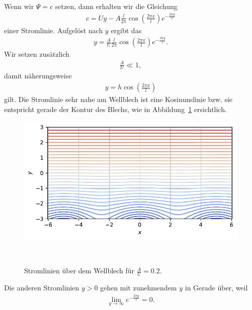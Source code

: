 Wenn wir $\Psi = c$ setzen, dann erhalten wir die Gleichung
\begin{align}
    c = U y - A \frac{l}{2 \pi} 
    \cos\left(\frac{2 \pi x}{l}\right) 
    e^{-\frac{2 \pi y}{l}}\label{eq:stromlinie}
\end{align}
einer Stromlinie.
Aufgelöst nach $y$ ergibt das
\begin{align*}
    y
    =
    \frac{A}{U} \frac{l}{2 \pi} 
    \cos\left(\frac{2 \pi x}{l}\right) 
    e^{-\frac{2 \pi y}{l}}.
\end{align*}
Wir setzen zusätzlich 
\begin{align*}
    \frac{A}{U} \ll 1,
\end{align*}
damit näherungsweise
\begin{align*}
    y
    =
    h \cos\left(\frac{2 \pi x}{l}\right)
\end{align*}
gilt.
Die Stromlinie sehr nahe am Wellblech ist eine
Kosinunslinie bzw. sie entspricht gerade der Kontur
des Blechs, wie in Abbildung~\ref{fig:stromlinien} ersichtlich.
\begin{figure}
    \centering
    \includegraphics[width=\textwidth]{papers/ueberschall/figures/Stromlinien.pdf}
    \caption{Stromlinien über dem Wellblech für $\frac{A}{U}=0.2$.}
    ~\label{fig:stromlinien}  
\end{figure}
Die anderen Stromlinien $y > 0$ gehen mit zunehmendem $y$
in Gerade über, weil
\begin{align*}
    \lim_{y \to \infty}
    e^{-\frac{2 \pi y}{l}}
    =
    0.
\end{align*}


